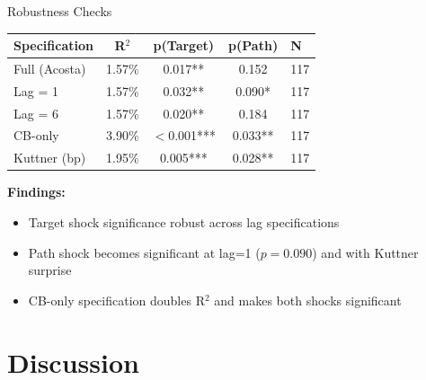 \documentclass[aspectratio=169, 11pt]{beamer}
\begin{document}
\begin{frame}{Robustness Checks}
  \centering
  \begin{tabular}{lcccl}
    \toprule
    Specification & R$^2$ & p(Target) & p(Path) & N \\
    \midrule
    Full (Acosta)  & 1.57\% & 0.017** & 0.152 & 117 \\
    Lag = 1        & 1.57\% & 0.032** & 0.090* & 117 \\
    Lag = 6        & 1.57\% & 0.020** & 0.184 & 117 \\
    CB-only        & 3.90\% & $<$0.001*** & 0.033** & 117 \\
    Kuttner (bp)   & 1.95\% & 0.005*** & 0.028** & 117 \\
    \bottomrule
  \end{tabular}

  \vspace{0.5em}
  \textbf{Findings:}
  \begin{itemize}
    \item Target shock significance robust across lag specifications
    \item Path shock becomes significant at lag=1 ($p = 0.090$) and with Kuttner surprise
    \item CB-only specification doubles R$^2$ and makes both shocks significant
  \end{itemize}
\end{frame}

\section{Discussion}
\end{document}
